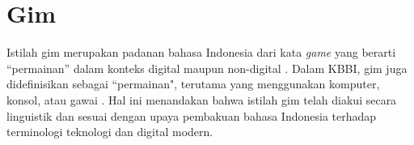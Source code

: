 

\section{Gim}\label{}
Istilah gim merupakan padanan bahasa Indonesia dari kata \textit{game} yang berarti “permainan” dalam konteks digital maupun non-digital \citep{danny2021valorant}. Dalam KBBI, gim juga didefinisikan sebagai “permainan", terutama yang menggunakan komputer, konsol, atau gawai \citep{KBBI2026}. Hal ini menandakan bahwa istilah gim telah diakui secara linguistik dan sesuai dengan upaya pembakuan bahasa Indonesia terhadap terminologi teknologi dan digital modern.

